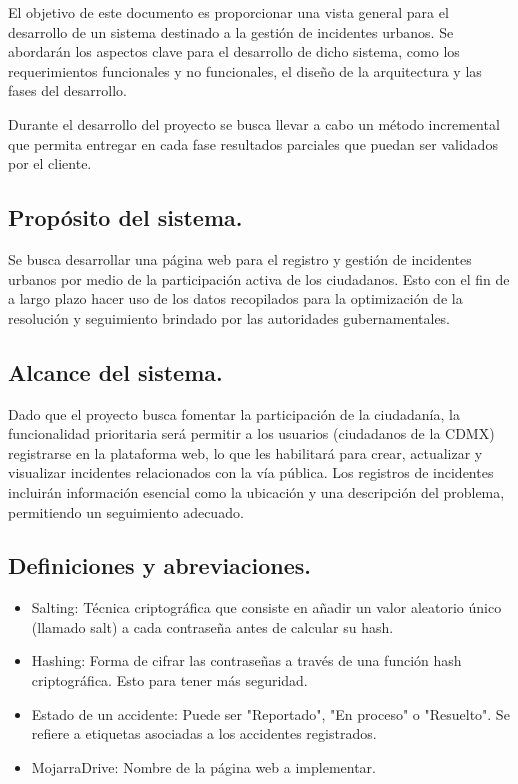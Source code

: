 El objetivo de este documento es proporcionar una vista general para el desarrollo de un sistema destinado a la gestión de incidentes urbanos. Se abordarán los aspectos clave para el desarrollo de dicho sistema, como los requerimientos funcionales y no funcionales,  el diseño de la arquitectura y las fases del desarrollo.

Durante el desarrollo del proyecto se busca llevar a cabo un método incremental que permita entregar en cada fase resultados parciales que puedan ser validados por el cliente.

\subsection{Propósito del sistema.}

Se busca desarrollar una página web para el registro y gestión de incidentes urbanos por medio de la participación activa de los ciudadanos. Esto con el fin de a largo plazo hacer uso de los datos recopilados para la optimización de la resolución y seguimiento brindado por las autoridades gubernamentales.

\subsection{Alcance del sistema.}

Dado que el proyecto busca fomentar la participación de la ciudadanía, la funcionalidad prioritaria será permitir a los usuarios (ciudadanos de la CDMX) registrarse en la plataforma web, lo que les habilitará para crear, actualizar y visualizar incidentes relacionados con la vía pública. Los registros de incidentes incluirán información esencial como la ubicación y una descripción del problema, permitiendo un seguimiento adecuado.

\subsection{Definiciones y abreviaciones.}
\begin{itemize}
    \item Salting: Técnica criptográfica que consiste en añadir un valor aleatorio único (llamado salt) a cada contraseña antes de calcular su hash. 
    \item Hashing: Forma de cifrar las contraseñas a través de una función hash criptográfica. Esto para tener más seguridad.
    \item Estado de un accidente: Puede ser "Reportado", "En proceso" o "Resuelto". Se refiere a etiquetas asociadas a los accidentes registrados.
    \item MojarraDrive: Nombre de la página web a implementar.
\end{itemize}

